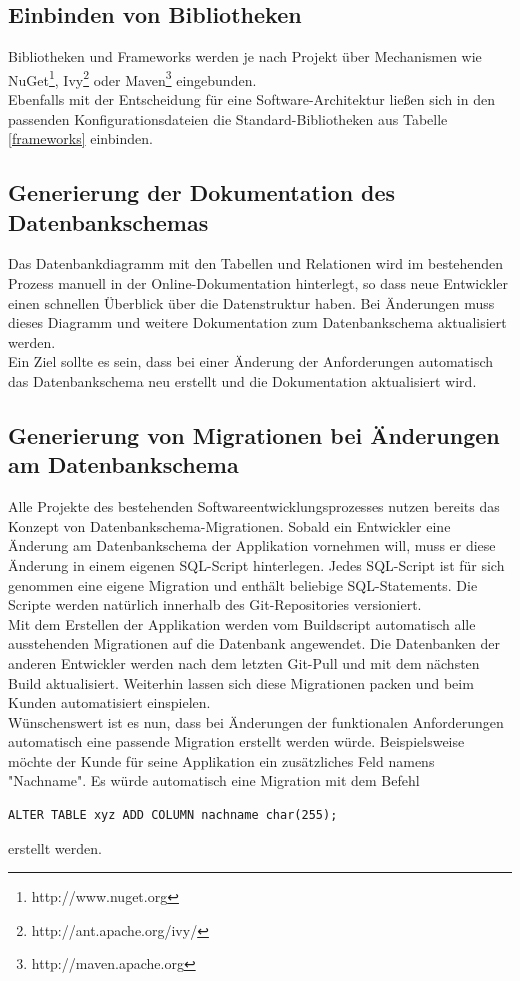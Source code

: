 \documentclass[a4paper,12pt]{scrreprt}
\begin{document}
\subsection{Einbinden von Bibliotheken}
Bibliotheken und Frameworks werden je nach Projekt über Mechanismen wie NuGet\footnote{http://www.nuget.org}, Ivy\footnote{http://ant.apache.org/ivy/} oder Maven\footnote{http://maven.apache.org} eingebunden.
\\
Ebenfalls mit der Entscheidung für eine Software-Architektur ließen sich in den passenden Konfigurationsdateien die Standard-Bibliotheken aus Tabelle \ref{frameworks} einbinden. 
\subsection{Generierung der Dokumentation des Datenbankschemas}
Das Datenbankdiagramm mit den Tabellen und Relationen wird im bestehenden Prozess manuell in der Online-Dokumentation hinterlegt, so dass neue Entwickler einen schnellen Überblick über die Datenstruktur haben. Bei Änderungen muss dieses Diagramm und weitere Dokumentation zum Datenbankschema aktualisiert werden.
\\
Ein Ziel sollte es sein, dass bei einer Änderung der Anforderungen automatisch das Datenbankschema neu erstellt und die Dokumentation aktualisiert wird.
\subsection{Generierung von Migrationen bei Än\-de\-run\-gen am Datenbankschema}
Alle Projekte des bestehenden Softwareentwicklungsprozesses nutzen bereits das Konzept von Datenbankschema-Migrationen. 
Sobald ein Entwickler eine Änderung am Datenbankschema der Applikation vornehmen will, muss er diese Änderung in einem eigenen SQL-Script hinterlegen. Jedes SQL-Script ist für sich genommen eine eigene Migration und enthält beliebige SQL-Statements. Die Scripte werden natürlich innerhalb des Git-Repositories versioniert.\\
Mit dem Erstellen der Applikation werden vom Buildscript automatisch alle ausstehenden Migrationen auf die Datenbank angewendet.
Die Datenbanken der anderen Entwickler werden nach dem letzten Git-Pull und mit dem nächsten Build aktualisiert. Weiterhin lassen sich diese Migrationen packen und beim Kunden automatisiert einspielen.
\\
Wünschenswert ist es nun, dass bei Änderungen der funktionalen Anforderungen automatisch eine passende Migration erstellt werden würde. Beispielsweise möchte der Kunde für seine Applikation ein zusätzliches Feld namens "Nachname". Es würde automatisch eine Migration mit dem Befehl 
\begin{verbatim}
ALTER TABLE xyz ADD COLUMN nachname char(255);
\end{verbatim}
 erstellt werden.
\end{document}
